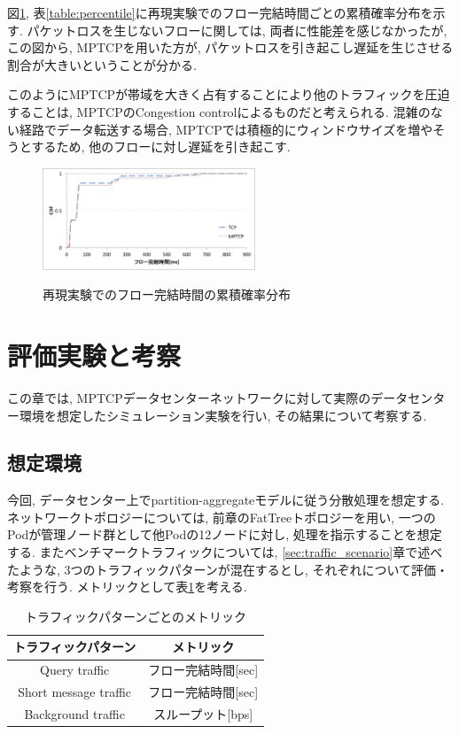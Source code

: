 \documentclass[technicalreport]{ieicej}
\begin{document}
図\ref{fig:delay_loss}, 表\ref{table:percentile}に再現実験でのフロー完結時間ごとの累積確率分布を示す.
パケットロスを生じないフローに関しては, 両者に性能差を感じなかったが, この図から, MPTCPを用いた方が,
パケットロスを引き起こし遅延を生じさせる割合が大きいということが分かる.

このようにMPTCPが帯域を大きく占有することにより他のトラフィックを圧迫することは, MPTCPのCongestion
controlによるものだと考えられる.
混雑のない経路でデータ転送する場合, MPTCPでは積極的にウィンドウサイズを増やそうとするため, 他のフローに対し遅延を引き起こす.


\begin{figure}[h]
    \begin{center}
    \includegraphics[autoebb, width=180pt]{./img/cdf_rep.pdf}
    \caption{再現実験でのフロー完結時間の累積確率分布}
    \label{fig:delay_loss}
    \end{center}
\end{figure}

\section{評価実験と考察}
\label{sec:evaluation}
この章では, MPTCPデータセンターネットワークに対して実際のデータセンター環境を想定したシミュレーション実験を行い, その結果について考察する.

\subsection{想定環境}
今回, データセンター上でpartition-aggregateモデルに従う分散処理を想定する.
ネットワークトポロジーについては, 前章のFatTreeトポロジーを用い, 一つのPodが管理ノード群として他Podの12ノードに対し,
処理を指示することを想定する.
またベンチマークトラフィックについては, \ref{sec:traffic_scenario}章で述べたような, 3つのトラフィックパターンが混在するとし,
それぞれについて評価・考察を行う.
メトリックとして表\ref{metric}を考える.
\begin{table}[h]
\begin{center}
\begin{tabular}{c|c}
\hline
トラフィックパターン & メトリック \\ \hline \hline
Query traffic & フロー完結時間[sec] \\
Short message traffic & フロー完結時間[sec] \\
Background traffic & スループット[bps] \\
\hline
\end{tabular}
\caption{トラフィックパターンごとのメトリック}
\label{metric}
\end{center}
\end{table}
\end{document}

